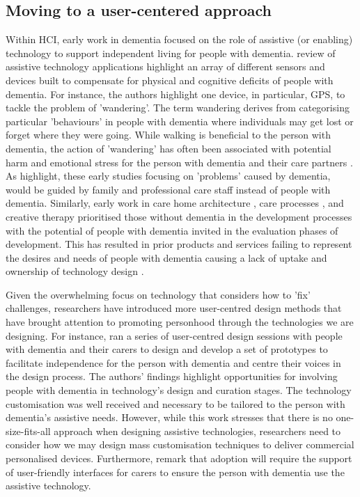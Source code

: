 \subsection{Moving to a user-centered approach}
\label{BL:Tech}
Within HCI, early work in dementia focused on the role of assistive (or enabling) technology to support independent living for people with dementia. \cite{bharucha2009intelligent} review of assistive technology applications highlight an array of different sensors and devices built to compensate for physical and cognitive deficits of people with dementia. For instance, the authors highlight one device, in particular, GPS, to tackle the problem of 'wandering'. The term wandering derives from categorising particular 'behaviours' in people with dementia where individuals may get lost or forget where they were going. While walking is beneficial to the person with dementia, the action of 'wandering' has often been associated with potential harm and emotional stress for the person with dementia and their care partners \citep{robinson2007balancing}. As \cite{bharucha2009intelligent} highlight, these early studies focusing on 'problems' caused by dementia, would be guided by family and professional care staff instead of people with dementia. Similarly, early work in care home architecture \citep{torrington2006has}, care processes \citep{rabins2006practical}, and creative therapy \citep{schmitt2006creative} prioritised those without dementia in the development processes with the potential of people with dementia invited in the evaluation phases of development. This has resulted in prior products and services failing to represent the desires and needs of people with dementia causing a lack of uptake and ownership of technology design \citep{gibson2019personalisation}. 

Given the overwhelming focus on technology that considers how to 'fix' challenges, researchers have introduced more user-centred design methods that have brought attention to promoting personhood through the technologies we are designing. For instance, \cite{robinson2009keeping} ran a series of user-centred design sessions with people with dementia and their carers to design and develop a set of prototypes to facilitate independence for the person with dementia and centre their voices in the design process. The authors' findings highlight opportunities for involving people with dementia in technology's design and curation stages. The technology customisation was well received and necessary to be tailored to the person with dementia's assistive needs. However, while this work stresses that there is no one-size-fits-all approach when designing assistive technologies, researchers need to consider how we may design mass customisation techniques to deliver commercial personalised devices. Furthermore, \cite{robinson2009keeping} remark that adoption will require the support of user-friendly interfaces for carers to ensure the person with dementia use the assistive technology. 

